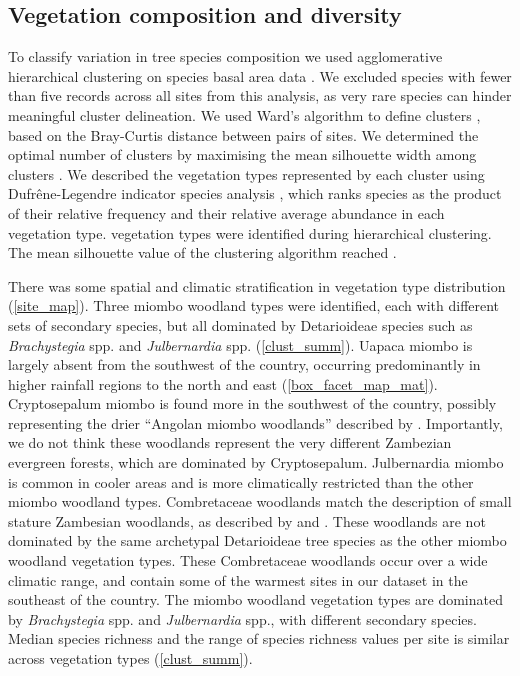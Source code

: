 \documentclass[11pt,a4paper]{article}
\begin{document}
\subsection{Vegetation composition and diversity} 

To classify variation in tree species composition we used agglomerative
hierarchical clustering on species basal area data \citep{Kreft2010,
Fayolle2014}. We excluded species with fewer than five records across all sites
from this analysis, as very rare species can hinder meaningful cluster
delineation. We used Ward's algorithm to define clusters \citep{Murtagh2014},
based on the Bray-Curtis distance between pairs of sites. We determined the
optimal number of clusters by maximising the mean silhouette width among
clusters \citep{Rousseeuw1987}. We described the vegetation types represented
by each cluster using Dufr\^{e}ne-Legendre indicator species analysis
\citep{Dufrene1997}, which ranks species as the product of their relative
frequency and their relative average abundance in each vegetation type.
\Numberstringnum{\nCluster} vegetation types were identified during
hierarchical clustering. The mean silhouette value of the clustering algorithm
reached \silBest{}. 

There was some spatial and climatic stratification in vegetation type
distribution (\autoref{site_map}). Three miombo woodland types were identified,
each with different sets of secondary species, but all dominated by
Detarioideae species such as \textit{Brachystegia} spp. and
\textit{Julbernardia} spp. (\autoref{clust_summ}). Uapaca miombo is largely
absent from the southwest of the country, occurring predominantly in higher
rainfall regions to the north and east (\autoref{box_facet_map_mat}).
Cryptosepalum miombo is found more in the southwest of the country, possibly
representing the drier ``Angolan miombo woodlands'' described by
\citet{White1983}. Importantly, we do not think these woodlands represent the
very different Zambezian evergreen forests, which are dominated by
Cryptosepalum. Julbernardia miombo is common in cooler areas and is more
climatically restricted than the other miombo woodland types. Combretaceae
woodlands match the description of small stature Zambesian woodlands, as
described by \citet{Dinerstein2017} and \citet{Chidumayo2001}. These woodlands
are not dominated by the same archetypal Detarioideae tree species as the other
miombo woodland vegetation types. These Combretaceae woodlands occur over a
wide climatic range, and contain some of the warmest sites in our dataset in
the southeast of the country. The miombo woodland vegetation types are
dominated by \textit{Brachystegia} spp. and \textit{Julbernardia} spp., with
different secondary species. Median species richness and the range of species
richness values per site is similar across vegetation types
(\autoref{clust_summ}). 
\end{document}
